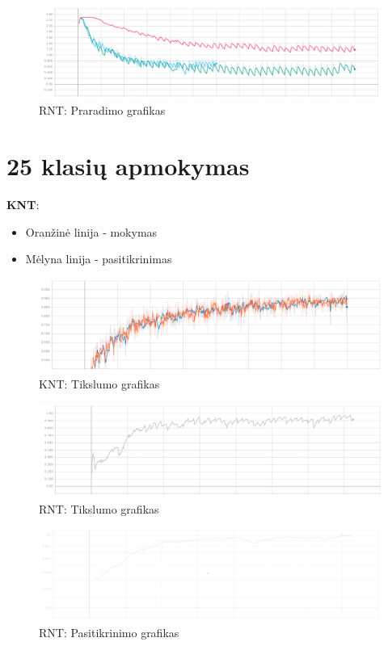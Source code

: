\documentclass{VUMIFPSbakalaurinis}
\begin{document}
\begin{figure}[H]
	\centering
	\includegraphics[scale=0.3]{img/2/loss}
	\caption{RNT: Praradimo grafikas}
	\label{img:10loss}
\end{figure}


\section{25 klasių apmokymas}
\label{appendix:25kl}



\textbf{KNT}:
\begin{itemize}
	\item Oranžinė linija - mokymas
	\item Mėlyna linija - pasitikrinimas
\end{itemize}

\begin{figure}[H]
	\centering
	\includegraphics[scale=0.3]{img/3/knn-acc}
	\caption{KNT: Tikslumo grafikas}
	\label{img:25KNT-acc}
\end{figure}

\begin{figure}[H]
	\centering
	\includegraphics[scale=0.3]{img/3/acc}
	\caption{RNT: Tikslumo grafikas}
	\label{img:25acc}
\end{figure}

\begin{figure}[H]
	\centering
	\includegraphics[scale=0.3]{img/3/val}
	\caption{RNT: Pasitikrinimo grafikas}
	\label{img:25val}
\end{figure}
\end{document}
